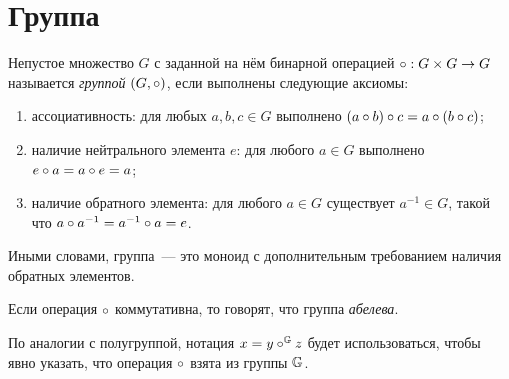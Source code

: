 \section{Группа}
\label{sec:Group}

\begin{definition}[Группа]
    Непустое%
    множество $G$ с заданной на нём бинарной операцией $\circ: {G} \times {G} \to {G}$ называется \emph{группой} $(G ,\circ)$, если выполнены следующие аксиомы:
    \begin{enumerate}
        \item ассоциативность: для любых $a, b, c \in G$ выполнено $(a \circ b) \circ c = a \circ (b \circ c)$;
        \item наличие нейтрального элемента $e$: для любого $a \in G$ выполнено $e \circ a = a \circ e = a$;
        \item наличие обратного элемента: для любого $a \in G$ существует $a^{-1} \in G$, такой что $a \circ a^{-1} = a^{-1} \circ a = e$.
    \end{enumerate}
\end{definition}

Иными словами, группа~--- это моноид с дополнительным требованием наличия обратных элементов.

\begin{definition}
    Если операция $\circ$ коммутативна, то говорят, что группа \emph{абелева}.
\end{definition}

По аналогии с полугруппой, нотация $x = y \circ^{\mathbb{\mathbb{G}}} z$ будет использоваться, чтобы явно указать, что операция $\circ$ взята из группы $\mathbb{G}$.

